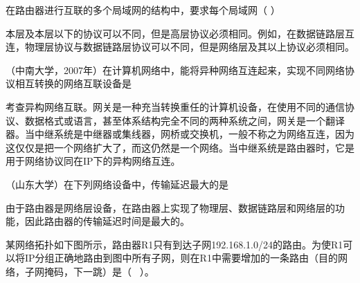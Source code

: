 \question 在路由器进行互联的多个局域网的结构中，要求每个局域网（ ）
\par{}
\begin{solution}本层及本层以下的协议可以不同，但是高层协议必须相同。例如，在数据链路层互连，物理层协议与数据链路层协议可以不同，但是网络层及其以上协议必须相同。
\end{solution}
\question （中南大学，2007年）在计算机网络中，能将异种网络互连起来，实现不同网络协议相互转换的网络互联设备是
\par{}
\begin{solution}考查异构网络互联。网关是一种充当转换重任的计算机设备，在使用不同的通信协议、数据格式或语言，甚至体系结构完全不同的两种系统之间，网关是一个翻译器。当中继系统是中继器或集线器，网桥或交换机，一般不称之为网络互连，因为这仅仅是把一个网络扩大了，而这仍然是一个网络。当中继系统是路由器时，它是用于网络协议同在IP下的异构网络互连。
\end{solution}
\question （山东大学）在下列网络设备中，传输延迟最大的是
\par{}
\begin{solution}由于路由器是网络层设备，在路由器上实现了物理层、数据链路层和网络层的功能，因此路由器的传输延迟时间是最大的。
\end{solution}
\question 某网络拓扑如下图所示，路由器R1只有到达子网192.168.1.0/24的路由。为使R1可以将IP分组正确地路由到图中所有子网，则在R1中需要增加的一条路由（目的网络，子网掩码，下一跳）是（
~）。

